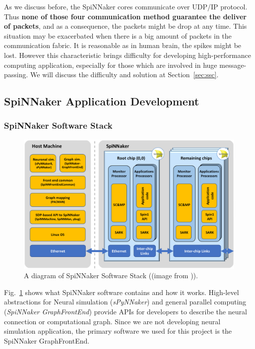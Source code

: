 As we discuss before, the SpiNNaker cores communicate over UDP/IP protocol. Thus \textbf{none of those four communication method guarantee the deliver of packets}, and as a consequence, the packets might be drop at any time. This situation may be exacerbated when there is a big amount of packets in the communication fabric. It is reasonable as in human brain, the spikes might be lost. However this characteristic brings difficulty for developing high-performance computing application, especially for those which are involved in huge message-passing. We will discuss the difficulty and solution at Section~\ref{sec:ssc}.

\subsection{SpiNNaker Application Development} \label{sec:sss}
\subsubsection{SpiNNaker Software Stack}
    \begin{figure}[!tb]
        \centering
       \includegraphics[width=1\textwidth]{figures/software_stack.png}
       \caption{A diagram of SpiNNaker Software Stack ((image from \cite{spin-chip-resources})).}
       \label{fig:software_stack}
    \end{figure}

Fig.~\ref{fig:software_stack} shows what SpiNNaker software contains and how it works. High-level abstractions for Neural simulation (\textit{sPyNNaker}) and general parallel computing (\textit{SpiNNaker GraphFrontEnd}) provide APIs for developers to describe the neural connection or computational graph. Since we are not developing neural simulation application, the primary software we used for this project is the SpiNNaker GraphFrontEnd. 

